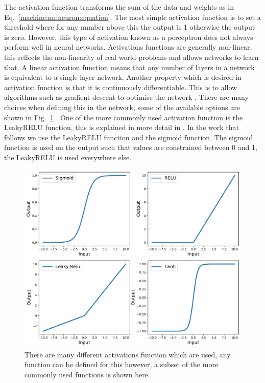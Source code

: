 The activation function transforms the sum of the data and weights as in Eq.~\ref{machine:nn:neuron:equation}. 
The most simple activation function is to set a threshold where for any number above this the output is 1 otherwise the output is zero. However, this type of activation known as a perceptron does not always perform well in neural networks.
Activations functions are generally non-linear, this reflects the non-linearity of real world problems and allows networks to learn that. 
A linear activation function means that any number of layers in a network is equivalent to a single layer network.
Another property which is desired in activation function is that it is continuously differentiable. This is to allow algorithms such as gradient descent to optimise the network \citep{nwankpa2018ActivationFunctions}. 
There are many choices when defining this in the network, some of the available options are shown in Fig.~\ref{machine:nn:activation:plot} \citep{nwankpa2018ActivationFunctions}.
One of the more commonly used activation function is the LeakyRELU function, this is explained in more detail in \citep{maas2013RectifierNonlinearities}.
In the work that follows we use the LeakyRELU function and the sigmoid function.
The sigmoid function is used on the output such that values are constrained between 0 and 1, the LeakyRELU is used everywhere else. 


\begin{figure}[h]
	\centering
	\includegraphics[width=0.8\columnwidth]{C4_cnn/activations.pdf}
	\caption[Examples of activation functions.]{There are many different activations function which are used, any function can be defined for this however, a subset of the more commonly used functions is shown here.}
	\label{machine:nn:activation:plot}
\end{figure}






